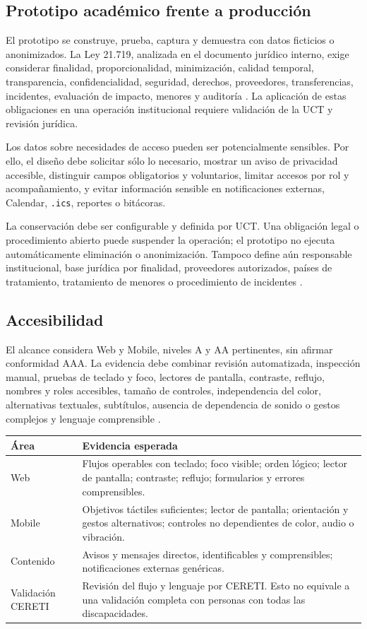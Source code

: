 \documentclass[10pt,a4paper,oneside]{article}
\begin{document}
\subsection{Prototipo académico frente a producción}

El prototipo se construye, prueba, captura y demuestra con datos ficticios o anonimizados. La Ley 21.719, analizada en el documento jurídico interno, exige considerar finalidad, proporcionalidad, minimización, calidad temporal, transparencia, confidencialidad, seguridad, derechos, proveedores, transferencias, incidentes, evaluación de impacto, menores y auditoría \citep{ley21719}. La aplicación de estas obligaciones en una operación institucional requiere validación de la UCT y revisión jurídica.

Los datos sobre necesidades de acceso pueden ser potencialmente sensibles. Por ello, el diseño debe solicitar sólo lo necesario, mostrar un aviso de privacidad accesible, distinguir campos obligatorios y voluntarios, limitar accesos por rol y acompañamiento, y evitar información sensible en notificaciones externas, Calendar, \texttt{.ics}, reportes o bitácoras.

La conservación debe ser configurable y definida por UCT. Una obligación legal o procedimiento abierto puede suspender la operación; el prototipo no ejecuta automáticamente eliminación o anonimización. Tampoco define aún responsable institucional, base jurídica por finalidad, proveedores autorizados, países de tratamiento, tratamiento de menores o procedimiento de incidentes \citep{adr001,adr003}.

\subsection{Accesibilidad}

El alcance considera Web y Mobile, niveles A y AA pertinentes, sin afirmar conformidad AAA. La evidencia debe combinar revisión automatizada, inspección manual, pruebas de teclado y foco, lectores de pantalla, contraste, reflujo, nombres y roles accesibles, tamaño de controles, independencia del color, alternativas textuales, subtítulos, ausencia de dependencia de sonido o gestos complejos y lenguaje comprensible \citep{wcag22,wcagmobile}.

\begin{tabularx}{\textwidth}{@{}L{0.25\textwidth}Y@{}}
\toprule
\textbf{Área} & \textbf{Evidencia esperada}\\
\midrule
Web & Flujos operables con teclado; foco visible; orden lógico; lector de pantalla; contraste; reflujo; formularios y errores comprensibles.\\
Mobile & Objetivos táctiles suficientes; lector de pantalla; orientación y gestos alternativos; controles no dependientes de color, audio o vibración.\\
Contenido & Avisos y mensajes directos, identificables y comprensibles; notificaciones externas genéricas.\\
Validación CERETI & Revisión del flujo y lenguaje por CERETI. Esto no equivale a una validación completa con personas con todas las discapacidades.\\
\bottomrule
\end{tabularx}
\end{document}
